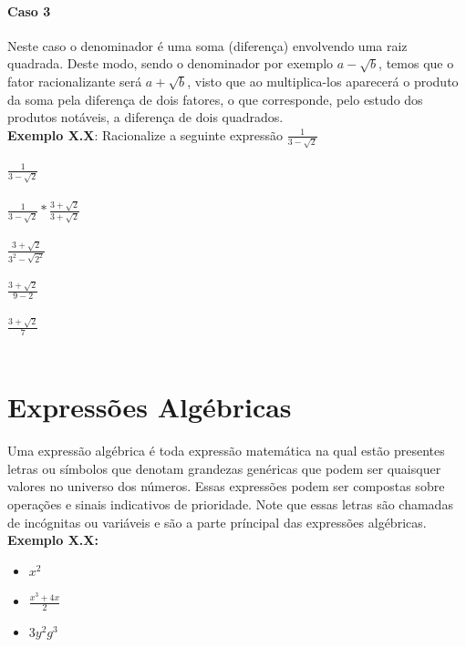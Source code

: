 \documentclass[a4paper,12pt,twoside,BCOR=10mm]{scrbook}
\begin{document}
\begin{titlepage}
\subsubsection{Caso 3}
Neste caso o denominador é uma soma (diferença) envolvendo uma raiz quadrada. Deste modo, sendo o denominador por exemplo $a - \sqrt{b}$, temos que o fator racionalizante será $a + \sqrt{b}$, visto que ao multiplica-los aparecerá o produto da soma pela diferença de dois fatores, o que corresponde, pelo estudo dos produtos notáveis, a diferença de dois quadrados.
\\
\textbf{Exemplo X.X}: Racionalize a seguinte expressão $\frac{1}{3 - \sqrt{2}}$
\\
\begin{center}
$\frac{1}{3 - \sqrt{2}}$\\ \\
$\frac{1}{3 - \sqrt{2}} * \frac{3 + \sqrt{2}}{3 + \sqrt{2}}$ \\\\
$\frac{3 + \sqrt{2}}{3^{2} - \sqrt{2^{2}}}$\\ \\
$\frac{3 + \sqrt{2}}{9 - 2}$\\\\
$\frac{3 + \sqrt{2}}{7}$\\\\
\end{center}


\chapter{Expressões Algébricas}
Uma expressão algébrica é toda expressão matemática na qual estão presentes letras ou símbolos que denotam grandezas genéricas que podem ser quaisquer valores no universo dos números. Essas expressões podem ser compostas sobre operações e sinais indicativos de prioridade. Note que essas letras são chamadas de incógnitas ou variáveis e são a parte príncipal das expressões algébricas.
\\
\textbf{Exemplo X.X:}
\begin{itemize}
\item $x^{2}$
\item $ \frac{x^{3}+4x}{2}$
\item $ 3y^{2}g^{3}$
\end{itemize}

\end{titlepage}
\end{document}
